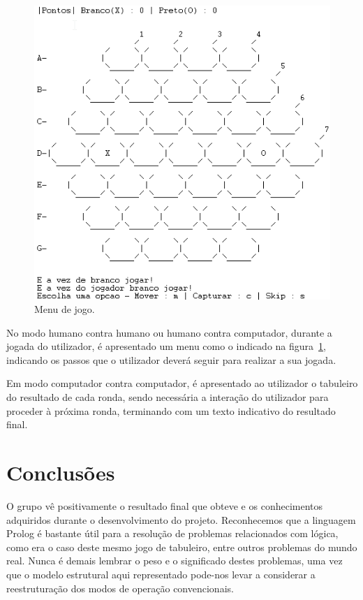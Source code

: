 \documentclass[a4paper]{article}
\begin{document}
\begin{figure}[h]

    	\centering
     	\includegraphics[scale=0.5]{ingame1}
	\caption{Menu de jogo.}
	\label{fig:figuramenu}

\end{figure}
No modo humano contra humano ou humano contra computador, durante a jogada do utilizador, é apresentado um menu como o indicado na figura~\ref{fig:figuramenu}, indicando os passos que o utilizador deverá seguir para realizar a sua jogada.

Em modo computador contra computador, é apresentado ao utilizador o tabuleiro do resultado de cada ronda, sendo necessária a interação do utilizador para proceder à próxima ronda, terminando com um texto indicativo do resultado final.



\newpage
\section{Conclusões}
O grupo vê positivamente o resultado final que obteve e os conhecimentos adquiridos durante o desenvolvimento do projeto. Reconhecemos que a linguagem Prolog é bastante útil para a resolução de problemas relacionados com lógica, como era o caso deste mesmo jogo de tabuleiro, entre outros problemas do mundo real. Nunca é demais lembrar o peso e o significado destes problemas, uma vez que o modelo estrutural aqui representado pode-nos levar a considerar a reestruturação dos modos de operação convencionais.
\\
\end{document}
